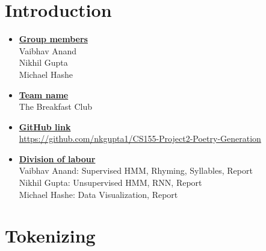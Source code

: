 \newif\ifshowsolutions
\showsolutionstrue

\newcommand{\boldline}[1]{\underline{\textbf{#1}}}


\usepackage{amsfonts} %
\usepackage{amsmath} %
\usepackage{longtable} %
\usepackage{enumitem}
\usepackage{graphicx} %
\graphicspath{{figures/}} %
\usepackage{makecell}
\usepackage[margin=2.25cm]{caption}


\pagestyle{fancy}

\section{Introduction}
\medskip
\begin{itemize}

    \item \boldline{Group members} \\
    Vaibhav Anand \\
    Nikhil Gupta \\
    Michael Hashe
    
    \item \boldline{Team name} \\
    The Breakfast Club

    \item \boldline{GitHub link} \\
    \href{https://github.com/nkgupta1/CS155-Project2-Poetry-Generation}{https://github.com/nkgupta1/CS155-Project2-Poetry-Generation}
    
    \item \boldline{Division of labour} \\
    Vaibhav Anand: Supervised HMM, Rhyming, Syllables, Report \\
    Nikhil Gupta: Unsupervised HMM, RNN, Report \\
    Michael Hashe: Data Visualization, Report

\end{itemize}

\section{Tokenizing}
\medskip

